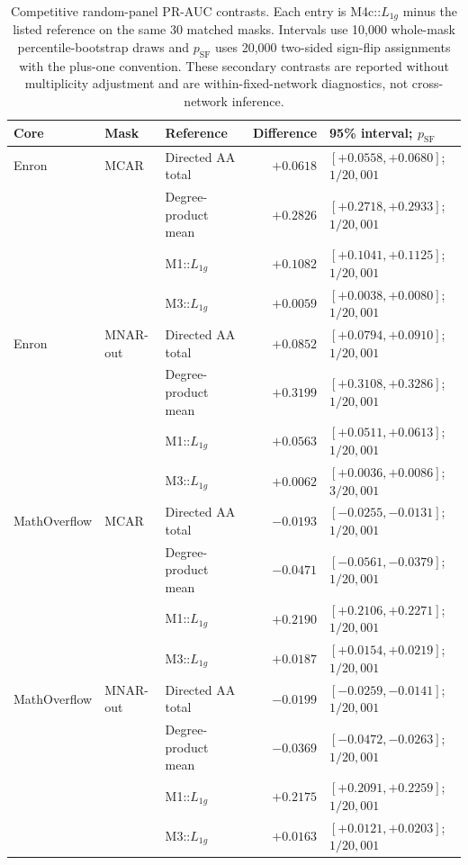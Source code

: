 \documentclass[10pt]{article}
\begin{document}
\begin{table}[H]
\centering
\caption{Competitive random-panel PR-AUC contrasts. Each entry is M4c::$L_{1g}$ minus the listed reference on the same 30 matched masks. Intervals use 10,000 whole-mask percentile-bootstrap draws and $p_{\mathrm{SF}}$ uses 20,000 two-sided sign-flip assignments with the plus-one convention. These secondary contrasts are reported without multiplicity adjustment and are within-fixed-network diagnostics, not cross-network inference.}
\label{tab:competitive}
\scriptsize
\setlength{\tabcolsep}{3pt}
\begin{tabular}{@{}lllrl@{}}
\toprule
Core & Mask & Reference & Difference & 95\% interval; $p_{\mathrm{SF}}$\\
\midrule
Enron & MCAR & Directed AA total & $+0.0618$ & $[+0.0558,+0.0680]$; $1/20{,}001$\\
 &  & Degree-product mean & $+0.2826$ & $[+0.2718,+0.2933]$; $1/20{,}001$\\
 &  & M1::$L_{1g}$ & $+0.1082$ & $[+0.1041,+0.1125]$; $1/20{,}001$\\
 &  & M3::$L_{1g}$ & $+0.0059$ & $[+0.0038,+0.0080]$; $1/20{,}001$\\
\addlinespace
Enron & MNAR-out & Directed AA total & $+0.0852$ & $[+0.0794,+0.0910]$; $1/20{,}001$\\
 &  & Degree-product mean & $+0.3199$ & $[+0.3108,+0.3286]$; $1/20{,}001$\\
 &  & M1::$L_{1g}$ & $+0.0563$ & $[+0.0511,+0.0613]$; $1/20{,}001$\\
 &  & M3::$L_{1g}$ & $+0.0062$ & $[+0.0036,+0.0086]$; $3/20{,}001$\\
\addlinespace
MathOverflow & MCAR & Directed AA total & $-0.0193$ & $[-0.0255,-0.0131]$; $1/20{,}001$\\
 &  & Degree-product mean & $-0.0471$ & $[-0.0561,-0.0379]$; $1/20{,}001$\\
 &  & M1::$L_{1g}$ & $+0.2190$ & $[+0.2106,+0.2271]$; $1/20{,}001$\\
 &  & M3::$L_{1g}$ & $+0.0187$ & $[+0.0154,+0.0219]$; $1/20{,}001$\\
\addlinespace
MathOverflow & MNAR-out & Directed AA total & $-0.0199$ & $[-0.0259,-0.0141]$; $1/20{,}001$\\
 &  & Degree-product mean & $-0.0369$ & $[-0.0472,-0.0263]$; $1/20{,}001$\\
 &  & M1::$L_{1g}$ & $+0.2175$ & $[+0.2091,+0.2259]$; $1/20{,}001$\\
 &  & M3::$L_{1g}$ & $+0.0163$ & $[+0.0121,+0.0203]$; $1/20{,}001$\\
\bottomrule
\end{tabular}
\end{table}
\end{document}
